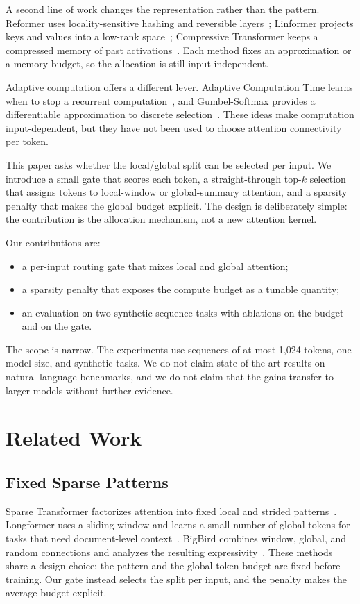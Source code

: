 \documentclass[10pt]{article}
\begin{document}
A second line of work changes the representation rather than the pattern. Reformer uses locality-sensitive hashing and reversible layers~\cite{Kitaev2020Reformer}; Linformer projects keys and values into a low-rank space~\cite{Wang2020Linformer}; Compressive Transformer keeps a compressed memory of past activations~\cite{Rae2020Compressive}. Each method fixes an approximation or a memory budget, so the allocation is still input-independent.

Adaptive computation offers a different lever. Adaptive Computation Time learns when to stop a recurrent computation~\cite{Graves2016Adaptive}, and Gumbel-Softmax provides a differentiable approximation to discrete selection~\cite{Jang2017Categorical}. These ideas make computation input-dependent, but they have not been used to choose attention connectivity per token.

This paper asks whether the local/global split can be selected per input. We introduce a small gate that scores each token, a straight-through top-$k$ selection that assigns tokens to local-window or global-summary attention, and a sparsity penalty that makes the global budget explicit. The design is deliberately simple: the contribution is the allocation mechanism, not a new attention kernel.

Our contributions are:
\begin{itemize}
  \item a per-input routing gate that mixes local and global attention;
  \item a sparsity penalty that exposes the compute budget as a tunable quantity;
  \item an evaluation on two synthetic sequence tasks with ablations on the budget and on the gate.
\end{itemize}

The scope is narrow. The experiments use sequences of at most 1{,}024 tokens, one model size, and synthetic tasks. We do not claim state-of-the-art results on natural-language benchmarks, and we do not claim that the gains transfer to larger models without further evidence.

\section{Related Work}
\label{sec:related_work}
\subsection{Fixed Sparse Patterns}
\label{sec:fixed_sparse}
Sparse Transformer factorizes attention into fixed local and strided patterns~\cite{Child2019Generating}. Longformer uses a sliding window and learns a small number of global tokens for tasks that need document-level context~\cite{Beltagy2020Longformer}. BigBird combines window, global, and random connections and analyzes the resulting expressivity~\cite{Zaheer2020Big}. These methods share a design choice: the pattern and the global-token budget are fixed before training. Our gate instead selects the split per input, and the penalty makes the average budget explicit.
\end{document}
